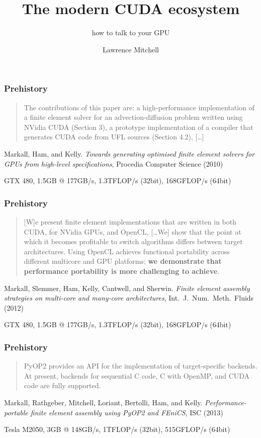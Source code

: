 \documentclass[aspectratio=169]{beamer}
\title{The modern CUDA ecosystem}
\subtitle{how to talk to your GPU}
\author{Lawrence Mitchell}
\institute{\texttt{lmitchell@nvidia.com}}
\begin{document}
\maketitle

\begin{frame}
  \frametitle{Prehistory}
  \begin{quote}
    The contributions of this paper are: a high-performance
    implementation of a finite element solver for an
    advection-diffusion problem written using NVidia CUDA (Section 3),
    a prototype implementation of a compiler that generates CUDA code
    from UFL sources (Section 4.2), [\dots]
  \end{quote}
  \pause
  {
    \scriptsize
    \raggedleft
    Markall, Ham, and Kelly.
    \emph{Towards generating optimised finite
      element solvers for GPUs from high-level specifications},
    Procedia Computer Science (2010) \nocite{Markall:2010}
    \par
    GTX 480, 1.5GB @ 177GB/s, 1.3TFLOP/s (32bit), 168GFLOP/s (64bit)
    \par
  }
\end{frame}
\begin{frame}
  \frametitle{Prehistory}
  \begin{quote}
    [W]e present finite element implementations that are
    written in both CUDA, for NVidia GPUs, and OpenCL, [\dots We] show
    that the point at which it becomes profitable to switch algorithms
    differs between target architectures. Using OpenCL achieves
    functional portability across different multicore and GPU
    platforms; \textbf{we demonstrate that performance portability is more
    challenging to achieve}.
  \end{quote}
  \pause
  {
    \scriptsize
    \raggedleft
    Markall, Slemmer, Ham, Kelly, Cantwell, and Sherwin.
    \emph{Finite element assembly strategies on multi-core and many-core architectures},
    Int.~J.~Num.~Meth.~Fluids (2012) \nocite{Markall:2013a}
    \par
    \vspace{\baselineskip}
    GTX 480, 1.5GB @ 177GB/s, 1.3TFLOP/s (32bit), 168GFLOP/s (64bit)
    \par
  }
\end{frame}

\begin{frame}
  \frametitle{\textcolor{black!40}{Pre}history}
  \begin{quote}
    PyOP2 provides an API for the implementation of target-specific
    backends. At present, backends for sequential C code, C with
    OpenMP, and CUDA code are fully supported.
  \end{quote}
  \pause
  {
    \scriptsize
    \raggedleft
    Markall, Rathgeber, Mitchell, Loriant, Bertolli, Ham, and Kelly.
    \emph{Performance-portable finite element assembly using PyOP2 and FEniCS},
    ISC (2013) \nocite{Markall:2013}
    \par
    Tesla M2050, 3GB @ 148GB/s, 1TFLOP/s (32bit), 515GFLOP/s (64bit)
    \par
  }
\end{frame}
\end{document}
